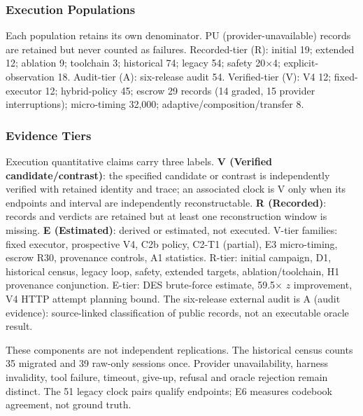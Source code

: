 \subsubsection{Execution Populations}\label{sec:pops}
Each population retains its own denominator. PU
(provider-unavailable) records are retained but never counted as failures.
Recorded-tier (R): initial 19; extended 12; ablation 9; toolchain 3; historical 74; legacy 54; safety 20$\times$4; explicit-observation 18. Audit-tier (A): six-release audit 54. Verified-tier (V): V4 12; fixed-executor 12; hybrid-policy 45; escrow 29 records (14 graded, 15 provider interruptions); micro-timing 32{,}000; adaptive/composition/transfer 8.
\subsubsection{Evidence Tiers}\label{sec:tiers}
Execution quantitative claims carry three labels. \textbf{V (Verified
candidate/contrast)}: the specified candidate or contrast is independently
verified with retained identity and trace; an associated clock is V only when
its endpoints and interval are independently reconstructable.
\textbf{R (Recorded)}: records and verdicts are retained but at least one
reconstruction window is missing. \textbf{E (Estimated)}: derived or estimated,
not executed. V-tier families: fixed executor, prospective V4, C2b policy,
C2-T1 (partial), E3 micro-timing, escrow R30, provenance
controls, A1 statistics. R-tier: initial campaign, D1, historical census,
legacy loop, safety, extended targets, ablation/toolchain, H1 provenance
conjunction. E-tier: DES brute-force estimate, 59.5$\times$ $z$ improvement,
V4 HTTP attempt planning bound. The six-release external audit is A (audit
evidence): source-linked classification of public records, not an executable
oracle result.

These components are not independent replications. The historical census
counts 35 migrated and 39 raw-only sessions once. Provider unavailability,
harness invalidity, tool failure, timeout, give-up, refusal and oracle rejection
remain distinct. The 51 legacy clock pairs qualify endpoints; E6 measures
codebook agreement, not ground truth.

